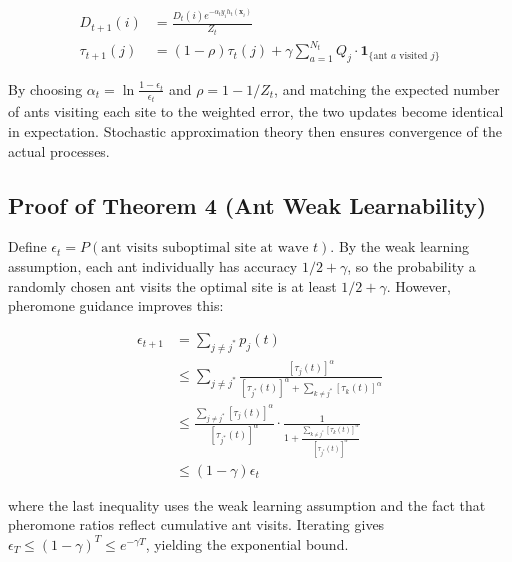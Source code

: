 \documentclass[12pt,letterpaper]{article}
\begin{document}
\begin{align}
D_{t+1}(i) &= \frac{D_t(i) e^{-\alpha_t y_i h_t(\mathbf{x}_i)}}{Z_t} \\
\tau_{t+1}(j) &= (1-\rho)\tau_t(j) + \gamma \sum_{a=1}^{N_t} Q_j \cdot \mathbf{1}_{\{\text{ant }a \text{ visited } j\}}
\end{align}

By choosing $\alpha_t = \ln\frac{1-\epsilon_t}{\epsilon_t}$ and $\rho = 1 - 1/Z_t$, and matching the expected number of ants visiting each site to the weighted error, the two updates become identical in expectation. Stochastic approximation theory then ensures convergence of the actual processes.

\subsection{Proof of Theorem 4 (Ant Weak Learnability)}

Define $\epsilon_t = P(\text{ant visits suboptimal site at wave } t)$. By the weak learning assumption, each ant individually has accuracy $1/2 + \gamma$, so the probability a randomly chosen ant visits the optimal site is at least $1/2 + \gamma$. However, pheromone guidance improves this:

\begin{align}
\epsilon_{t+1} &= \sum_{j \neq j^*} p_j(t) \\
&\leq \sum_{j \neq j^*} \frac{[\tau_j(t)]^\alpha}{[\tau_{j^*}(t)]^\alpha + \sum_{k \neq j^*} [\tau_k(t)]^\alpha} \\
&\leq \frac{\sum_{j \neq j^*} [\tau_j(t)]^\alpha}{[\tau_{j^*}(t)]^\alpha} \cdot \frac{1}{1 + \frac{\sum_{k \neq j^*} [\tau_k(t)]^\alpha}{[\tau_{j^*}(t)]^\alpha}} \\
&\leq (1-\gamma) \epsilon_t
\end{align}

where the last inequality uses the weak learning assumption and the fact that pheromone ratios reflect cumulative ant visits. Iterating gives $\epsilon_T \leq (1-\gamma)^T \leq e^{-\gamma T}$, yielding the exponential bound.

\end{document}
